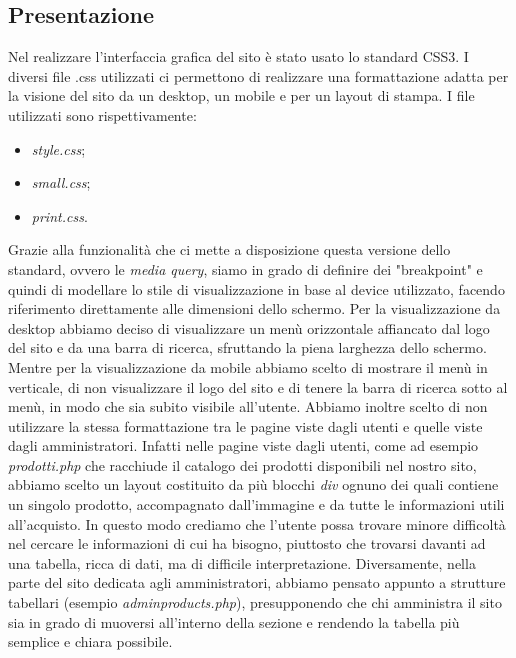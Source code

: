 \subsection{Presentazione}

Nel realizzare l'interfaccia grafica del sito è stato usato lo standard CSS3.\newline
I diversi file .css utilizzati ci permettono di realizzare una formattazione adatta per la visione del sito da un desktop, un mobile e per un layout di stampa.\newline
I file utilizzati sono rispettivamente:
\begin{itemize}
\item\textit{style.css};
\item\textit{small.css};
\item\textit{print.css}.
\end{itemize}\newline
Grazie alla funzionalità che ci mette a disposizione questa versione dello standard, ovvero le \textit{media query}, siamo in grado di definire dei "breakpoint" e quindi di modellare lo stile di visualizzazione in base al device utilizzato, facendo riferimento direttamente alle dimensioni dello schermo.\newline
Per la visualizzazione da desktop abbiamo deciso di visualizzare un menù orizzontale affiancato dal logo del sito e da una barra di ricerca, sfruttando la piena larghezza dello schermo.\newline 
Mentre per la visualizzazione da mobile abbiamo scelto di mostrare il menù in verticale, di non visualizzare il logo del sito e di tenere la barra di ricerca sotto al menù, in modo che sia subito visibile all'utente.\newline
\newline
Abbiamo inoltre scelto di non utilizzare la stessa formattazione tra le pagine viste dagli utenti e quelle viste dagli amministratori. Infatti nelle pagine viste dagli utenti, come ad esempio \textit{prodotti.php} che racchiude il catalogo dei prodotti disponibili nel nostro sito, abbiamo scelto un layout costituito da più blocchi \textit{div} ognuno dei quali contiene un singolo prodotto, accompagnato dall'immagine e da tutte le informazioni utili all'acquisto.\newline
In questo modo crediamo che l'utente possa trovare minore difficoltà nel cercare le informazioni di cui ha bisogno, piuttosto che trovarsi davanti ad una tabella, ricca di dati, ma di difficile interpretazione.\newline
Diversamente, nella parte del sito dedicata agli amministratori, abbiamo pensato appunto a strutture tabellari (esempio \textit{adminproducts.php}), presupponendo che chi amministra il sito sia in grado di muoversi all'interno della sezione e rendendo la tabella più semplice e chiara possibile.
